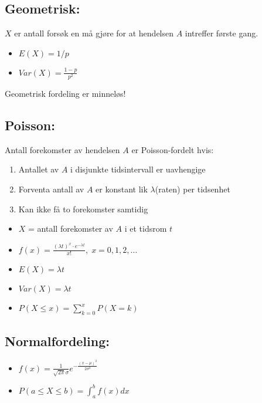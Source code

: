 \documentclass[8pt,a4paper,twocolumn,twoside]{article}
\begin{document}
\subsection*{Geometrisk:}
$X$ er antall forsøk en må gjøre for at hendelsen $A$ intreffer første gang.
\begin{itemize}[topsep=0pt,itemsep=0pt, partopsep=0pt]
    \item $E(X)=1/p$
    \item $Var(X)=\frac{1-p}{p^2}$
\end{itemize}
Geometrisk fordeling er minneløs!
%
%
\subsection*{Poisson:}
Antall forekomster av hendelsen $A$ er Poisson-fordelt hvis:
\begin{enumerate}[topsep=0pt,itemsep=0pt, partopsep=0pt]
    \item Antallet av $A$ i disjunkte tidsintervall er uavhengige
    \item Forventa antall av $A$ er konstant lik $\lambda$(raten) per tidsenhet
    \item Kan ikke få to forekomster samtidig
\end{enumerate}
\begin{itemize}[topsep=0pt,itemsep=0pt, partopsep=0pt]
    \item $X$ = antall forekomster av $A$ i et tidsrom $t$
    \item $f(x) = \frac{(\lambda t)^x\cdot e^{-\lambda t}}{x!},\; x=0,1,2,\dots$
    \item $E(X) = \lambda t$
    \item $Var(X) = \lambda t$
    \item $P(X\leq x)=\sum_{k=0}^x P(X=k)$
\end{itemize}
%
%
\subsection*{Normalfordeling:}
\begin{itemize}[topsep=0pt,itemsep=0pt, partopsep=0pt]
    \item $f(x)=\frac{1}{\sqrt{2\pi}\sigma}e^{-\frac{(x-\mu)^2}{2\sigma^2}}$
    \item $P(a\leq X \leq b) = \int_a^b f(x)dx$
\end{itemize}
\end{document}
